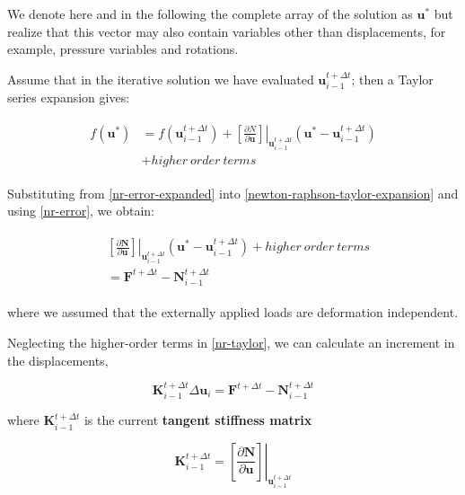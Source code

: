 \documentclass[10pt,b5paper,titlepage]{book}
\newenvironment{eqarray}
{
    \begin{eqnarray}
        \begin{aligned}
}
{
        \end{aligned}
    \end{eqnarray}
}
\begin{document}
We denote here and in the following the complete array of the solution as
$ \mathbf{u}^* $ but realize that this vector may also contain variables other
than displacements, for example, pressure variables and rotations.

Assume that in the iterative solution we have evaluated $ \mathbf{u}_{i-1}^{t + \Delta t} $;
then a Taylor series expansion gives:

\begin{eqarray}\label{newton-raphson-taylor-expansion}
    f(\mathbf{u}^*) &= f(\mathbf{u}_{i-1}^{t + \Delta t})
    + \left. \left[\frac{\partial N}{\partial \mathbf{u}} \right]
        \right|_{\mathbf{u}_{i-1}^{t + \Delta t}}
        \left( \mathbf{u}^* - \mathbf{u}_{i-1}^{t + \Delta t} \right) \\
                    &+ higher\ order\ terms
\end{eqarray}

Substituting from \eqref{nr-error-expanded} into \eqref{newton-raphson-taylor-expansion}
and using \eqref{nr-error}, we obtain:

\begin{eqarray}\label{nr-taylor}
    & \left. \left[ \frac{\partial \mathbf{N}}{\partial \mathbf{u}} \right]
        \right|_{\mathbf{u}_{i-1}^{t + \Delta t}}
    \left(\mathbf{u}^* - \mathbf{u}_{i-1}^{t + \Delta t} \right)
    + higher\ order\ terms\\
    & = \mathbf{F}^{t + \Delta t} - \mathbf{N}_{i-1}^{t + \Delta t}
\end{eqarray}

where we assumed that the externally applied loads are deformation independent.

Neglecting the higher-order terms in \eqref{nr-taylor}, we can calculate an increment
in the displacements,

\begin{equation}\label{nr-displacement-increment}
    \mathbf{K}_{i-1}^{t + \Delta t} \Delta \mathbf{u}_i =
    \mathbf{F}^{t + \Delta t} - \mathbf{N}_{i-1}^{t + \Delta t}
\end{equation}

where $ \mathbf{K}_{i-1}^{t + \Delta t} $ is the current \textbf{tangent stiffness matrix}

\begin{equation}
     \mathbf{K}_{i-1}^{t + \Delta t} =
     \left. \left[ \frac{\partial \mathbf{N}}{\partial \mathbf{u}} \right]
        \right|_{\mathbf{u}_{i-1}^{t + \Delta t}}
\end{equation}
\end{document}
